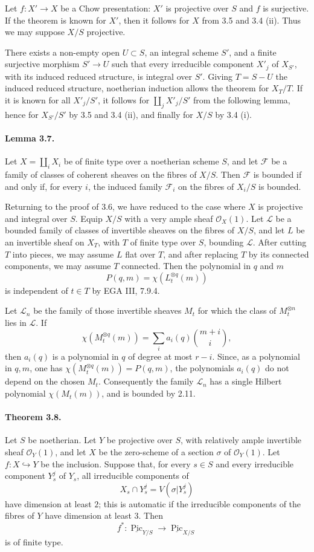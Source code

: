 \documentclass[12pt]{article}
\newcommand{\cO}{\mathcal O}
\newcommand{\cL}{\mathcal L}
\newcommand{\cF}{\mathcal F}
\newcommand{\Pic}{\operatorname{Pic}}
\newcommand{\longto}{\longrightarrow}
\begin{document}
Let $f:X'\to X$ be a Chow presentation: $X'$ is projective over $S$ and $f$ is surjective. If the theorem is known for $X'$, then it follows for $X$ from 3.5 and 3.4 (ii). Thus we may suppose $X/S$ projective.

There exists a non-empty open $U\subset S$, an integral scheme $S'$, and a finite surjective morphism $S'\to U$ such that every irreducible component $X'_j$ of $X_{S'}$, with its induced reduced structure, is integral over $S'$. Giving $T=S-U$ the induced reduced structure, noetherian induction allows the theorem for $X_T/T$. If it is known for all $X'_j/S'$, it follows for $\coprod_j X'_j/S'$ from the following lemma, hence for $X_{S'}/S'$ by 3.5 and 3.4 (ii), and finally for $X/S$ by 3.4 (i).

\paragraph{Lemma 3.7.}
Let $X=\coprod_i X_i$ be of finite type over a noetherian scheme $S$, and let $\cF$ be a family of classes of coherent sheaves on the fibres of $X/S$. Then $\cF$ is bounded if and only if, for every $i$, the induced family $\cF_i$ on the fibres of $X_i/S$ is bounded.

Returning to the proof of 3.6, we have reduced to the case where $X$ is projective and integral over $S$. Equip $X/S$ with a very ample sheaf $\cO_X(1)$. Let $\cL$ be a bounded family of classes of invertible sheaves on the fibres of $X/S$, and let $L$ be an invertible sheaf on $X_T$, with $T$ of finite type over $S$, bounding $\cL$. After cutting $T$ into pieces, we may assume $L$ flat over $T$, and after replacing $T$ by its connected components, we may assume $T$ connected. Then the polynomial in $q$ and $m$
\[
P(q,m)=\chi(L_t^{\otimes q}(m))
\]
is independent of $t\in T$ by EGA III, 7.9.4.

Let $\cL_n$ be the family of those invertible sheaves $M_t$ for which the class of $M_t^{\otimes n}$ lies in $\cL$. If
\[
\chi(M_t^{\otimes q}(m))=\sum_i a_i(q)\binom{m+i}{i},
\]
then $a_i(q)$ is a polynomial in $q$ of degree at most $r-i$. Since, as a polynomial in $q,m$, one has $\chi(M_t^{\otimes q}(m))=P(q,m)$, the polynomials $a_i(q)$ do not depend on the chosen $M_t$. Consequently the family $\cL_n$ has a single Hilbert polynomial $\chi(M_t(m))$, and is bounded by 2.11.

\paragraph{Theorem 3.8.}
Let $S$ be noetherian. Let $Y$ be projective over $S$, with relatively ample invertible sheaf $\cO_Y(1)$, and let $X$ be the zero-scheme of a section $\sigma$ of $\cO_Y(1)$. Let $f:X\hookrightarrow Y$ be the inclusion. Suppose that, for every $s\in S$ and every irreducible component $Y_s^j$ of $Y_s$, all irreducible components of
\[
X_s\cap Y_s^j=V(\sigma|Y_s^j)
\]
have dimension at least $2$; this is automatic if the irreducible components of the fibres of $Y$ have dimension at least $3$. Then
\[
f^*:\underline{\Pic}_{Y/S}\longto \underline{\Pic}_{X/S}
\]
is of finite type.
\end{document}
